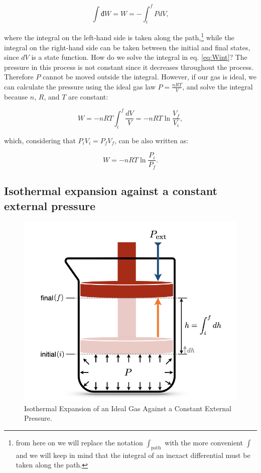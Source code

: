 \documentclass[
]{book}
\theoremstyle{definition}
\theoremstyle{definition}
\theoremstyle{definition}
\theoremstyle{remark}
\begin{document}
\begin{equation}
  \int đ W = W = - \int_{i}^{f} PdV,
  \label{eq:Wint}
\end{equation}

where the integral on the left-hand side is taken along the path,\footnote{from here on we will replace the notation \(\int_{\text{path}}\) with the more convenient \(\int\) and we will keep in mind that the integral of an inexact differential must be taken along the path.} while the integral on the right-hand side can be taken between the initial and final states, since \(dV\) is a state function.
How do we solve the integral in eq. \eqref{eq:Wint}? The pressure in this process is not constant since it decreases throughout the process. Therefore \(P\) cannot be moved outside the integral. However, if our gas is ideal, we can calculate the pressure using the ideal gas law \(P=\frac{nRT}{V}\), and solve the integral because \(n\), \(R\), and \(T\) are constant:

\begin{equation}
  W = - nRT \int_{i}^{f} \frac{dV}{V} = -nRT \ln \frac{V_f}{V_i},
  \label{eq:WintsolvedV}
\end{equation}

which, considering that \(P_iV_i=P_fV_f\), can be also written as:

\begin{equation}
  W = -nRT \ln \frac{P_i}{P_f}.
  \label{eq:WintsolvedP}
\end{equation}

\hypertarget{isothermal-expansion-against-a-constant-external-pressure}{%
\subsection{Isothermal expansion against a constant external pressure}\label{isothermal-expansion-against-a-constant-external-pressure}}

\begin{figure}

{\centering \includegraphics[width=0.5\linewidth]{./img/OEP_Figures.004} 

}

\caption{Isothermal Expansion of an Ideal Gas Against a Constant External Pressure.}\label{fig:Fig2c3}
\end{figure}
\end{document}
